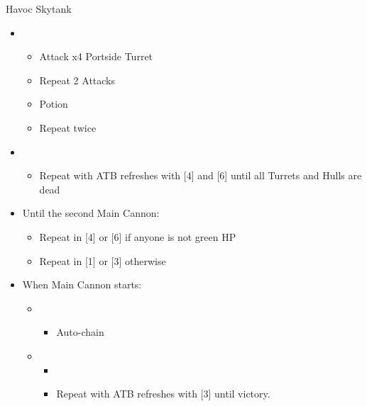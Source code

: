 \begin{paracol}{2}
	\begin{battle}{Havoc Skytank}
		\begin{itemize}
			\item \fifth
			      \begin{itemize}
				      \item Attack x4 Portside Turret
				      \item Repeat 2 Attacks
				      \item Potion
				      \item Repeat twice
			      \end{itemize}
			\item \fourth
			      \begin{itemize}
				      \item Repeat with ATB refreshes with [4] and [6] until all Turrets and Hulls are dead
			      \end{itemize}
			\item Until the second Main Cannon:
			      \begin{itemize}
				      \item Repeat in [4] or [6] if anyone is not green HP
				      \item Repeat in [1] or [3] otherwise
			      \end{itemize}
			\item When Main Cannon starts:
			      \begin{itemize}
				      \item \second
				            \begin{itemize}
					            \item Auto-chain
				            \end{itemize}
				      \item \first
				            \begin{itemize}
					            \item \stagger
					            \item Repeat with ATB refreshes with [3] until victory.
				            \end{itemize}
			      \end{itemize}
		\end{itemize}
	\end{battle}
	\switchcolumn*
	\switchcolumn
\end{paracol}
